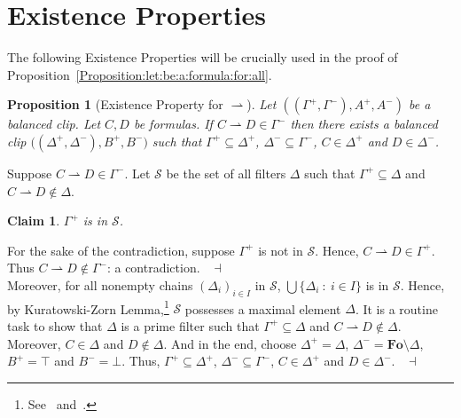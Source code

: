 \documentclass[draft]{article}
\newtheorem{claim}{Claim}
\newtheorem{proposition}{Proposition}
\newenvironment{proof}{{\bf Proof:}}{~$\dashv$\\}
\def\Fo{\mathbf{Fo}}
\begin{document}
\section{Existence Properties}\label{section:existence:properties}
%
%
The following Existence Properties will be crucially used in the proof of Proposition~\ref{Proposition:let:be:a:formula:for:all}.
%
%
%
%
%
%
%
%
\begin{proposition}[Existence Property for $\rightharpoonup$]\label{Proposition:let:be:a:balanced:clip:let:be:formulas:if:then:there:exists:a:balanced:clip:such:that:and:1}
%
%
Let $((\Gamma^{+},\Gamma^{-}),A^{+},A^{-})$ be a balanced clip.
Let $C,D$ be formulas.
If $C{\rightharpoonup}D{\in}\Gamma^{-}$ then there exists a balanced clip $((\Delta^{+},\Delta^{-}),
%
%
%
%
%
%
%
$\linebreak$
%
%
%
%
%
%
B^{+},B^{-})$ such that $\Gamma^{+}{\subseteq}\Delta^{+}$, $\Delta^{-}{\subseteq}\Gamma^{-}$, $C{\in}\Delta^{+}$ and $D{\in}\Delta^{-}$.
%
%
\end{proposition}
%
%
\begin{proof}
%
%
Suppose $C{\rightharpoonup}D{\in}\Gamma^{-}$.
Let ${\mathcal S}$ be the set of all filters $\Delta$ such that $\Gamma^{+}{\subseteq}\Delta$ and $C{\rightharpoonup}D{\not\in}\Delta$.
%
%
\begin{claim}
%
%
$\Gamma^{+}$ is in ${\mathcal S}$.
%
%
\end{claim}
%
%
\begin{proof}
%
%
For the sake of the contradiction, suppose $\Gamma^{+}$ is not in ${\mathcal S}$.
Hence, $C{\rightharpoonup}D{\in}\Gamma^{+}$.
Thus $C{\rightharpoonup}D{\not\in}\Gamma^{-}$: a contradiction.
%
%
\medskip
%
%
\end{proof}
%
%
Moreover, for all nonempty chains $(\Delta_{i})_{i{\in}I}$ in ${\mathcal S}$, $\bigcup\{\Delta_{i}\ :\ i{\in}I\}$ is in ${\mathcal S}$.
Hence, by Kuratowski-Zorn Lemma,\footnote{See~\cite[Chapter~$10$]{Davey:Priestley:2002} and~\cite[Chapter~$1$]{Wechler:1992}.} ${\mathcal S}$ possesses a maximal element $\Delta$.
It is a routine task to show that $\Delta$ is a prime filter such that $\Gamma^{+}{\subseteq}\Delta$ and $C{\rightharpoonup}D{\not\in}\Delta$.
Moreover, $C{\in}\Delta$ and $D{\not\in}\Delta$.
And in the end, choose $\Delta^{+}{=}\Delta$, $\Delta^{-}{=}\Fo{\setminus}\Delta$, $B^{+}{=}{\top}$ and $B^{-}{=}{\bot}$.
Thus, $\Gamma^{+}{\subseteq}\Delta^{+}$, $\Delta^{-}{\subseteq}\Gamma^{-}$, $C{\in}\Delta^{+}$ and $D{\in}\Delta^{-}$.
%
%
\medskip
%
%
\end{proof}
\end{document}
